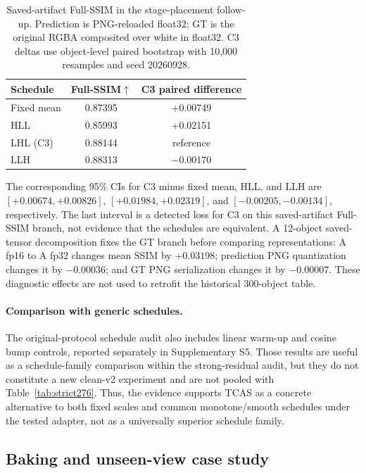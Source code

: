 \documentclass[times,twocolumn,final]{elsarticle}
\begin{document}
\begin{table}[t]
\centering
\caption{Saved-artifact Full-SSIM in the stage-placement follow-up. Prediction is PNG-reloaded float32; GT is the original RGBA composited over white in float32. C3 deltas use object-level paired bootstrap with 10,000 resamples and seed 20260928.}
\label{tab:serialized276}
\small
\begin{tabular}{lcc}
\toprule
Schedule & Full-SSIM$\uparrow$ & C3 paired difference \\
\midrule
Fixed mean & 0.87395 & +0.00749 \\
HLL & 0.85993 & +0.02151 \\
LHL (C3) & 0.88144 & reference \\
LLH & 0.88313 & $-$0.00170 \\
\bottomrule
\end{tabular}
\end{table}

The corresponding 95\% CIs for C3 minus fixed mean, HLL, and LLH are
$[+0.00674,+0.00826]$, $[+0.01984,+0.02319]$, and
$[-0.00205,-0.00134]$, respectively. The last interval is a detected loss for
C3 on this saved-artifact Full-SSIM branch, not evidence that the schedules
are equivalent. A 12-object saved-tensor decomposition fixes the GT branch
before comparing representations: A fp16 to A fp32 changes mean SSIM by
$+0.03198$; prediction PNG quantization changes it by $-0.00036$; and GT PNG
serialization changes it by $-0.00007$. These diagnostic effects are not used
to retrofit the historical 300-object table.

\paragraph{Comparison with generic schedules.}
The original-protocol schedule audit also includes linear warm-up and cosine
bump controls, reported separately in Supplementary S5. Those results are
useful as a schedule-family comparison within the strong-residual audit, but
they do not constitute a new clean-v2 experiment and are not pooled with
Table~\ref{tab:strict276}. Thus, the evidence supports TCAS as a concrete
alternative to both fixed scales and common monotone/smooth schedules under
the tested adapter, not as a universally superior schedule family.

\FloatBarrier

\subsection{Baking and unseen-view case study}
\label{subsec:baking}
\end{document}
